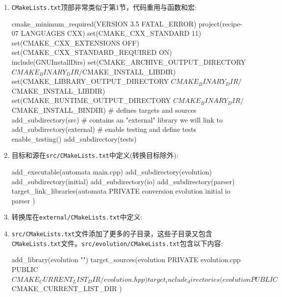 \begin{enumerate}
\item \texttt{CMakeLists.txt}顶部非常类似于第1节，代码重用与函数和宏:

\begin{codebox}[cmake]
cmake_minimum_required(VERSION 3.5 FATAL_ERROR)
project(recipe-07 LANGUAGES CXX)
set(CMAKE_CXX_STANDARD 11)
set(CMAKE_CXX_EXTENSIONS OFF)
set(CMAKE_CXX_STANDARD_REQUIRED ON)
include(GNUInstallDirs)
set(CMAKE_ARCHIVE_OUTPUT_DIRECTORY
${CMAKE_BINARY_DIR}/${CMAKE_INSTALL_LIBDIR})
set(CMAKE_LIBRARY_OUTPUT_DIRECTORY
${CMAKE_BINARY_DIR}/${CMAKE_INSTALL_LIBDIR})
set(CMAKE_RUNTIME_OUTPUT_DIRECTORY
${CMAKE_BINARY_DIR}/${CMAKE_INSTALL_BINDIR})
# defines targets and sources
add_subdirectory(src)
# contains an "external" library we will link to
add_subdirectory(external)
# enable testing and define tests
enable_testing()
add_subdirectory(tests)
\end{codebox}

\item 目标和源在\texttt{src/CMakeLists.txt}中定义(转换目标除外):

\begin{codebox}[cmake]
add_executable(automata main.cpp)
add_subdirectory(evolution)
add_subdirectory(initial)
add_subdirectory(io)
add_subdirectory(parser)
target_link_libraries(automata
  PRIVATE
    conversion
    evolution
    initial
    io
    parser
  )
\end{codebox}

\item 转换库在\texttt{external/CMakeLists.txt}中定义:


\item \texttt{src/CMakeLists.txt}文件添加了更多的子目录，这些子目录又包含\texttt{CMakeLists.txt}文件。\texttt{src/evolution/CMakeLists.txt}包含以下内容:

\begin{codebox}[cmake]
add_library(evolution "")
target_sources(evolution
  PRIVATE
    evolution.cpp
  PUBLIC
    ${CMAKE_CURRENT_LIST_DIR}/evolution.hpp
  )
target_include_directories(evolution
  PUBLIC
    ${CMAKE_CURRENT_LIST_DIR}
  )
\end{codebox}


\end{enumerate}
